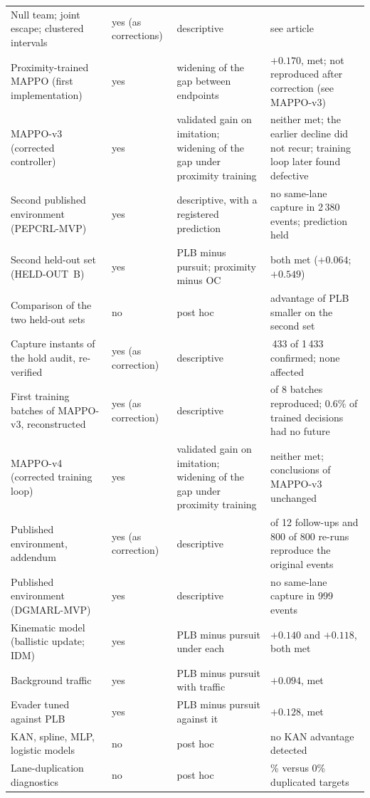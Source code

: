\documentclass[preprint,12pt]{elsarticle}
\begin{document}
{\begin{longtable}{@{}>{\raggedright\arraybackslash}p{}>{\raggedright\arraybackslash}p{}>{\raggedright\arraybackslash}p{}>{\raggedright\arraybackslash}p{}@{}}
Null team; joint escape; clustered intervals & yes (as corrections) & descriptive & see article \\
Proximity-trained MAPPO (first implementation) & yes & widening of the gap between endpoints & $+0.170$, met; not reproduced after correction (see MAPPO-v3) \\
MAPPO-v3 (corrected controller) & yes & validated gain on imitation; widening of the gap under proximity training & neither met; the earlier decline did not recur; training loop later found defective \\
Second published environment (PEPCRL-MVP) & yes & descriptive, with a registered prediction & no same-lane capture in 2\,380 events; prediction held \\
Second held-out set (HELD-OUT~B) & yes & PLB minus pursuit; proximity minus OC & both met ($+0.064$; $+0.549$) \\
Comparison of the two held-out sets & no & post hoc & advantage of PLB smaller on the second set \\
Capture instants of the hold audit, re-verified & yes (as correction) & descriptive & 1\,433 of 1\,433 confirmed; none affected \\
First training batches of MAPPO-v3, reconstructed & yes (as correction) & descriptive & 8 of 8 batches reproduced; 0.6\% of trained decisions had no future \\
MAPPO-v4 (corrected training loop) & yes & validated gain on imitation; widening of the gap under proximity training & neither met; conclusions of MAPPO-v3 unchanged \\
Published environment, addendum & yes (as correction) & descriptive & 12 of 12 follow-ups and 800 of 800 re-runs reproduce the original events \\
Published environment (DGMARL-MVP) & yes & descriptive & no same-lane capture in 999 events \\
Kinematic model (ballistic update; IDM) & yes & PLB minus pursuit under each & $+0.140$ and $+0.118$, both met \\
Background traffic & yes & PLB minus pursuit with traffic & $+0.094$, met \\
Evader tuned against PLB & yes & PLB minus pursuit against it & $+0.128$, met \\
KAN, spline, MLP, logistic models & no & post hoc & no KAN advantage detected \\
Lane-duplication diagnostics & no & post hoc & 49\% versus 0\% duplicated targets \\
\end{longtable}
}
\end{document}
